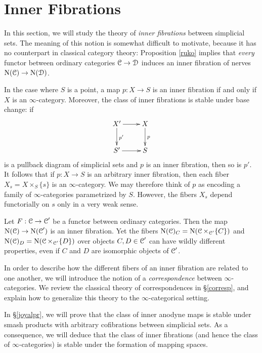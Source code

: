 \section{Inner Fibrations}\label{midfibsec}

\setcounter{theorem}{0}

In this section, we will study the theory of {\em inner fibrations} between simplicial sets. The meaning of this notion is somewhat difficult to motivate, because it has no counterpart in classical category theory: Proposition \ref{ruko} implies that {\em every} functor between ordinary categories $\operatorname{\mathcal{C}} \rightarrow \operatorname{\mathcal{D}}$ induces an inner fibration of nerves $\operatorname{N}(\operatorname{\mathcal{C}}) \rightarrow \operatorname{N}(\operatorname{\mathcal{D}})$.

In the case where $S$ is a point, a map $p: X \rightarrow S$ is an inner fibration if and only if
$X$ is an $\infty$-category. Moreover, the class of inner fibrations is stable under base change: if 
$$\xymatrix{ X' \ar[d]^{p'} \ar[r] & X \ar[d]^{p} \\ 
S' \ar[r] & S }$$ 
is a pullback diagram of simplicial sets and $p$ is an inner fibration, then so is $p'$.
It follows that if $p: X \rightarrow S$ is an arbitrary inner fibration, then each fiber
$X_{s} = X \times_{S} \{s\}$ is an $\infty$-category. We may therefore think of $p$ as encoding a family of $\infty$-categories parametrized by $S$. However, the fibers $X_{s}$ depend functorially on $s$ only in a very weak sense.

\begin{example}
Let $F: \operatorname{\mathcal{C}} \rightarrow \operatorname{\mathcal{C}}'$ be a functor between ordinary categories. Then the map $\operatorname{N}(\operatorname{\mathcal{C}}) \rightarrow \operatorname{N}(\operatorname{\mathcal{C}}')$ is an inner fibration. Yet the fibers
$\operatorname{N}(\operatorname{\mathcal{C}})_{C} = \operatorname{N}( \operatorname{\mathcal{C}} \times_{\operatorname{\mathcal{C}}'} \{C\} )$ and $\operatorname{N}(\operatorname{\mathcal{C}})_{D} = \operatorname{N}( \operatorname{\mathcal{C}} \times_{ \operatorname{\mathcal{C}}'} \{D\} )$ over objects $C,D \in \operatorname{\mathcal{C}}'$ can have wildly different properties, even if $C$ and $D$ are isomorphic objects of $\operatorname{\mathcal{C}}'$.
\end{example}

In order to describe how the different fibers of an inner fibration are related to one another, we will introduce the notion of a {\it correspondence} between $\infty$-categories. We review the classical theory of correspondences in \S \ref{corresp}, and explain how to generalize this theory to the $\infty$-categorical setting. 
 
In \S \ref{joyalpr}, we will prove that the class of inner anodyne maps is stable under smash products with arbitrary cofibrations between simplicial sets. As a consequence, we will deduce that the class of inner fibrations (and hence the class of $\infty$-categories) is stable under the formation of mapping spaces.

